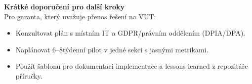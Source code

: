 \bigskip
\textbf{Krátké doporučení pro další kroky}\\
Pro garanta, který uvažuje přenos řešení na VUT:
\begin{itemize}
  \item Konzultovat plán s místním IT a GDPR/právním oddělením (DPIA/DPA).
  \item Naplánovat 6–8týdenní pilot v jedné sekci s jasnými metrikami.
  \item Použít šablonu pro dokumentaci implementace a lessons learned z repozitáře příručky.
\end{itemize}